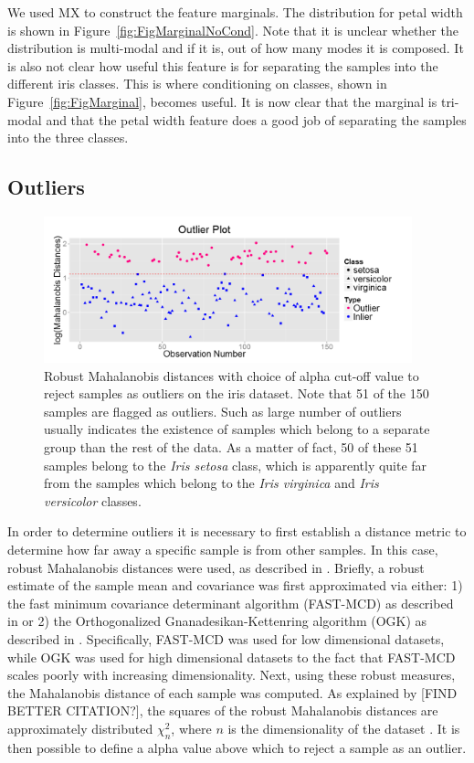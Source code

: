 \documentclass[12pt]{article}
\begin{document}
We used MX to construct the feature marginals. The distribution for petal width is shown in Figure~\ref{fig:FigMarginalNoCond}. Note that it is unclear whether the distribution is multi-modal and if it is, out of how many modes it is composed. It is also not clear how useful this feature is for separating the samples into the different iris classes. This is where conditioning on classes, shown in Figure~\ref{fig:FigMarginal}, becomes useful. It is now clear that the marginal is tri-modal and that the petal width feature does a good job of separating the samples into the three classes.

\subsection{Outliers}
\label{subsec:SubSecOutliers}

\begin{figure}[t!]
	\centering
	\includegraphics[width=0.95\textwidth]{Figures/Iris/OutliersIris.png}
	\caption{Robust Mahalanobis distances with choice of alpha cut-off value to reject samples as outliers on the iris dataset. Note that 51 of the 150 samples are flagged as outliers. Such as large number of outliers usually indicates the existence of samples which belong to a separate group than the rest of the data. As a matter of fact, 50 of these 51 samples belong to the \textit{Iris setosa} class, which is apparently quite far from the samples which belong to the \textit{Iris virginica} and \textit{Iris versicolor} classes.}
	\label{fig:FigOutliers}
\end{figure}

In order to determine outliers it is necessary to first establish a distance metric to determine how far away a specific sample is from other samples. In this case, robust Mahalanobis distances were used, as described in \cite{hubert2008high}. Briefly, a robust estimate of the sample mean and covariance was first approximated via either: 1) the fast minimum covariance determinant algorithm (FAST-MCD) as described in \cite{rousseeuw1999fast} or 2) the Orthogonalized Gnanadesikan-Kettenring algorithm (OGK) as described in \cite{maronna2002robust}. Specifically, FAST-MCD was used for low dimensional datasets, while OGK was used for high dimensional datasets to the fact that FAST-MCD scales poorly with increasing dimensionality. Next, using these robust measures, the Mahalanobis distance of each sample was computed. As explained by \cite{hardin2012distribution} [FIND BETTER CITATION?], the squares of the robust Mahalanobis distances are approximately distributed $\chi^2_n$, where $n$ is the dimensionality of the dataset . It is then possible to define a alpha value above which to reject a sample as an outlier. 
\end{document}
